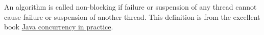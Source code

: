 An algorithm is called non-blocking if failure or suspension of any thread cannot cause failure or suspension of another thread. This definition is from the excellent book \href{http://jcip.net/}{Java concurrency in practice}.